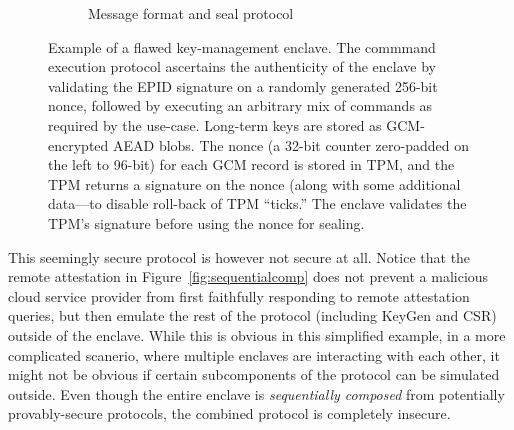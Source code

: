 \documentclass[10pt]{article}
\begin{document}
\begin{figure}[h]
\begin{subfigure}[b]{.5\textwidth}
    \caption{Message format and seal protocol}
    \label{fig:sealprotocol}
  \end{subfigure}
  \caption{Example of a flawed key-management enclave. The commmand
    execution protocol ascertains the authenticity of the enclave by
    validating the EPID signature on a randomly generated 256-bit
    nonce, followed by executing an arbitrary mix of commands as
    required by the use-case. Long-term keys are stored as
    GCM-encrypted AEAD blobs. The nonce (a 32-bit counter zero-padded
    on the left to 96-bit) for each GCM record is stored in TPM, and
    the TPM returns a signature on the nonce (along with some
    additional data---to disable roll-back of TPM ``ticks.'' The
    enclave validates the TPM's signature before using the nonce for
    sealing.}
  \label{fig:usecase}
  \end{figure}

  This seemingly secure protocol is however not secure at all. Notice
  that the remote attestation in Figure~\ref{fig:sequentialcomp} does
  not prevent a malicious cloud service provider from first faithfully
  responding to remote attestation queries, but then emulate the rest
  of the protocol (including \textsf{KeyGen} and CSR) outside of the
  enclave. While this is obvious in this simplified example, in a more
  complicated scanerio, where multiple enclaves are interacting with
  each other, it might not be obvious if certain subcomponents of the
  protocol can be simulated outside. Even though the entire enclave is
  \textit{sequentially composed} from potentially provably-secure
  protocols, the combined protocol is completely insecure.
\end{document}
